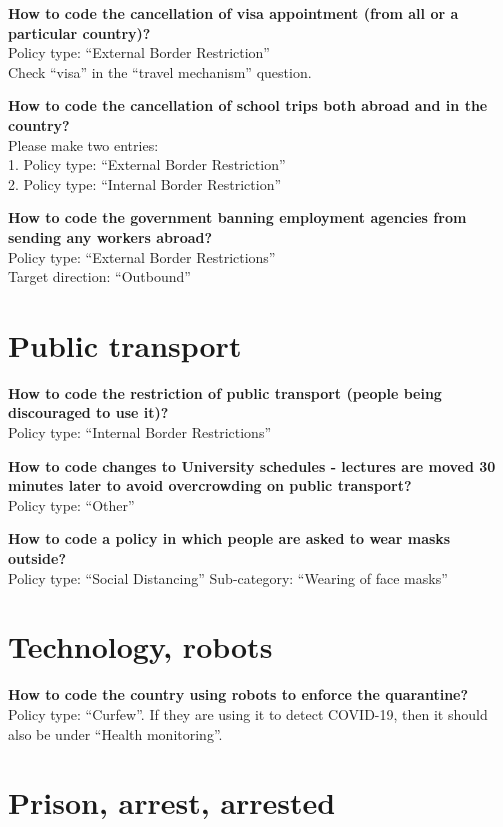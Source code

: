 \documentclass[
]{book}
\begin{document}
\textbf{How to code the cancellation of visa appointment (from all or a particular country)?}\\
Policy type: ``External Border Restriction''\\
Check ``visa'' in the ``travel mechanism'' question.

\textbf{How to code the cancellation of school trips both abroad and in the country?}\\
Please make two entries:\\
1. Policy type: ``External Border Restriction''\\
2. Policy type: ``Internal Border Restriction''

\textbf{How to code the government banning employment agencies from sending any workers abroad?}\\
Policy type: ``External Border Restrictions''\\
Target direction: ``Outbound''

\hypertarget{public-transport}{%
\section{Public transport}\label{public-transport}}

\textbf{How to code the restriction of public transport (people being discouraged to use it)?}\\
Policy type: ``Internal Border Restrictions''

\textbf{How to code changes to University schedules - lectures are moved 30 minutes later to avoid overcrowding on public transport?}\\
Policy type: ``Other''

\textbf{How to code a policy in which people are asked to wear masks outside?}\\
Policy type: ``Social Distancing''
Sub-category: ``Wearing of face masks''

\hypertarget{technology-robots}{%
\section{Technology, robots}\label{technology-robots}}

\textbf{How to code the country using robots to enforce the quarantine?}\\
Policy type: ``Curfew''. If they are using it to detect COVID-19, then it should also be under ``Health monitoring''.

\hypertarget{prison-arrest-arrested}{%
\section{Prison, arrest, arrested}\label{prison-arrest-arrested}}
\end{document}
